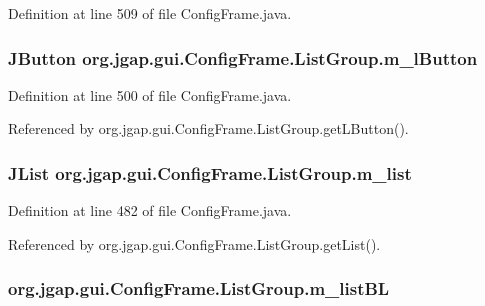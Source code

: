 Definition at line 509 of file Config\-Frame.\-java.

\hypertarget{classorg_1_1jgap_1_1gui_1_1_config_frame_1_1_list_group_af4b650bb5707cd0b8d8f68392654e59e}{
\subsubsection[{m\-\_\-l\-Button}]{\setlength{\rightskip}{0pt plus 5cm}J\-Button org.\-jgap.\-gui.\-Config\-Frame.\-List\-Group.\-m\-\_\-l\-Button\hspace{0.3cm}{\ttfamily [private]}}}\label{classorg_1_1jgap_1_1gui_1_1_config_frame_1_1_list_group_af4b650bb5707cd0b8d8f68392654e59e}


Definition at line 500 of file Config\-Frame.\-java.



Referenced by org.\-jgap.\-gui.\-Config\-Frame.\-List\-Group.\-get\-L\-Button().

\hypertarget{classorg_1_1jgap_1_1gui_1_1_config_frame_1_1_list_group_a17f9cab69ff7ee57fb0f912166d3c290}{
\subsubsection[{m\-\_\-list}]{\setlength{\rightskip}{0pt plus 5cm}J\-List org.\-jgap.\-gui.\-Config\-Frame.\-List\-Group.\-m\-\_\-list\hspace{0.3cm}{\ttfamily [private]}}}\label{classorg_1_1jgap_1_1gui_1_1_config_frame_1_1_list_group_a17f9cab69ff7ee57fb0f912166d3c290}


Definition at line 482 of file Config\-Frame.\-java.



Referenced by org.\-jgap.\-gui.\-Config\-Frame.\-List\-Group.\-get\-List().

\hypertarget{classorg_1_1jgap_1_1gui_1_1_config_frame_1_1_list_group_af1bab47308f165348d655b53ffceb9f8}{
\subsubsection[{m\-\_\-list\-B\-L}]{ org.\-jgap.\-gui.\-Config\-Frame.\-List\-Group.\-m\-\_\-list\-B\-L\hspace{0.3cm}{\ttfamily [private]}}}\label{classorg_1_1jgap_1_1gui_1_1_config_frame_1_1_list_group_af1bab47308f165348d655b53ffceb9f8}



